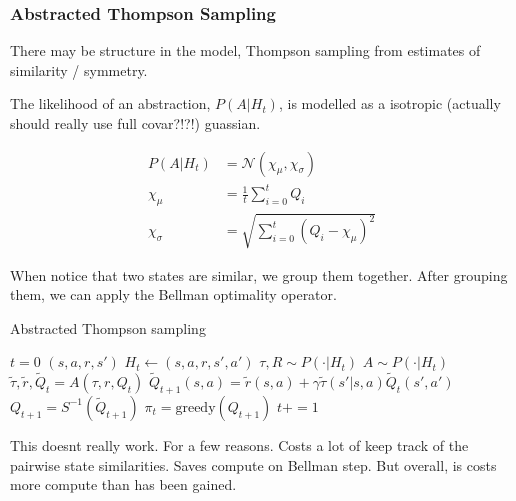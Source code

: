 \subsubsection{Abstracted Thompson Sampling}

There may be structure in the model,
Thompson sampling from estimates of similarity / symmetry.

The likelihood of an abstraction, $P(A|H_t)$, is modelled as a isotropic (actually should really use full covar?!?!) guassian.

\begin{align*}
	P(A|H_t) &= \mathcal N(\chi_{\mu}, \chi_{\sigma}) \\
	\chi_{\mu} &= \frac{1}{t}\sum_{i=0}^t Q_i \tag{mean} \\
	\chi_{\sigma} &= \sqrt{\sum_{i=0}^t (Q_i - \chi_{\mu})^2} \tag{standard deviation}
\end{align*}

When notice that two states are similar, we group them together. After grouping them, we can apply the Bellman optimality operator.

\begin{algorithm}
	\caption{Abstracted Thompson sampling}
	\begin{algorithmic}[1]

		\State $t=0$
		\State $(s, a, r, s')$ 
		\State $H_t \leftarrow (s, a, r, s', a')$ 
		\State $\tau, R \sim P(\cdot | H_t)$ 
		\State $A \sim P(\cdot | H_t)$ 
		\State $\tilde \tau, \tilde r, \tilde Q_t = A(\tau, r, Q_t)$ 
		\State $\tilde Q_{t+1}(s, a) = \tilde r(s, a) + \gamma \tilde \tau(s'| s, a) \tilde Q_t(s', a')$ 
		\State $Q_{t+1} = S^{-1}(\tilde Q_{t+1})$ 
		\State $\pi_t = \text{greedy}(Q_{t+1})$ 
		\State $t += 1$

		\EndWhile
		\State {}
		\EndProcedure

	\end{algorithmic}
\end{algorithm}


This doesnt really work. For a few reasons. Costs a lot of keep track of the pairwise state similarities.
Saves compute on Bellman step.
But overall, is costs more compute than has been gained.

